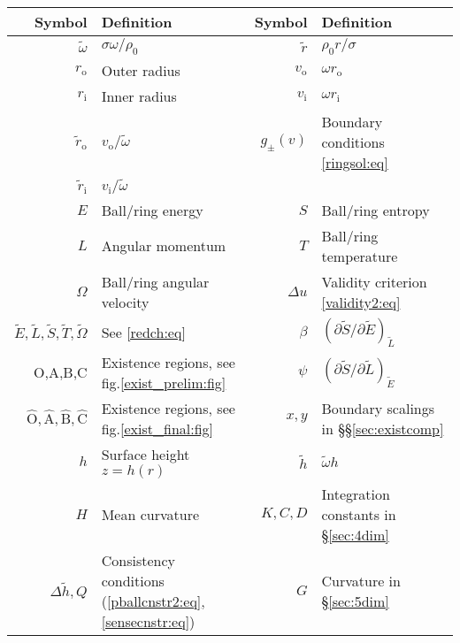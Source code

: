 \documentclass[12pt,a4paper]{article}
\newcommand{\p}{\partial}
\newcommand{\rz}{\rho_0}
\newcommand{\tA}{\hat{\mathrm{A}}}
\newcommand{\tB}{\hat{\mathrm{B}}}
\newcommand{\tC}{\hat{\mathrm{C}}}
\newcommand{\tOr}{\hat{\mathrm{O}}}
\newcommand{\tE}{\widetilde{E}}
\newcommand{\tL}{\widetilde{L}}
\newcommand{\tS}{\widetilde{S}}
\newcommand{\tT}{\widetilde{T}}
\newcommand{\tO}{\widetilde{\Omega}}
\newcommand{\ri}{r_\mathrm{i}}
\newcommand{\ro}{r_\mathrm{o}}
\newcommand{\vi}{v_\mathrm{i}}
\newcommand{\vo}{v_\mathrm{o}}
\newcommand{\z}{\tilde{r}}
\newcommand{\zi}{\z_\mathrm{i}}
\newcommand{\zo}{\z_\mathrm{o}}
\newcommand{\tw}{\widetilde{\omega}}
\newcommand{\g}{\tilde h}
\begin{document}
  \begin{tabular}{||r|l||r|l||}
    \hline
    Symbol & Definition & Symbol & Definition \\
    \hline
    $\tw$ & $\sigma\omega / \rz$ & $\z$ & $\rz r / \sigma$  \\
    $\ro$ & Outer radius & $\vo$ & $\omega \ro$ \\
    $\ri$ & Inner radius & $\vi$ & $\omega \ri$ \\
    $\zo$ & $\vo/\tw$ & $g_\pm(v)$ & Boundary conditions \eqref{ringsol:eq} \\
    $\zi$ & $\vi/\tw$ &  &    \\
    \hline
%
   $E$ & Ball/ring energy & $S$ & Ball/ring entropy \\
    $L$ & Angular momentum & $T$ & Ball/ring temperature \\
    $\Omega$ & Ball/ring angular velocity
       & $\Delta u$ & Validity criterion \eqref{validity2:eq}\\
    $\tE,\tL,\tS,\tT,\tO$ & See \eqref{redch:eq}
       & $\beta$ & $(\p\tS/\p\tE)_{\tL}$ \\
    O,A,B,C & Existence regions, see fig.\ref{exist_prelim:fig}
       & $\psi$ & $(\p\tS/\p\tL)_{\tE}$ \\
    $\tOr,\tA,\tB,\tC$ & Existence regions, see fig.\ref{exist_final:fig}
       & $x,y$ & Boundary scalings in \S\S\ref{sec:existcomp}  \\
    \hline
%
    $h$ & Surface height $z=h(r)$ & $\g$ & $\tw h$ \\
    $H$ & Mean curvature
      & $K,C,D$ & Integration constants in \S\ref{sec:4dim} \\
    $\Delta\g,Q$ & Consistency conditions
               (\ref{pballcnstr2:eq},\ref{sensecnstr:eq})
      & $G$ & Curvature in \S\ref{sec:5dim} \\
    \hline
  \end{tabular}




%
\end{document}
